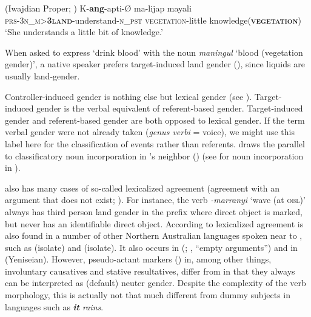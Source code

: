 \documentclass[output=collectionpaper]{langsci/langscibook}
\begin{document}
\ea\label{ex:WDG:73}
 (Iwajdian Proper; \citealt[972]{Singer2012})
\gll K-\textbf{ang}-apti-Ø	ma-lijap	mayali\\
\textsc{prs-3n\_m>\textbf{3land}}-understand-\textsc{n\_pst}	\textsc{vegetation}-little	knowledge(\textbf{\textsc{vegetation}})\\
\glt `She understands a little bit of knowledge.'\\
\z

When asked to express `drink blood' with the noun \textit{maningul} `blood (vegetation gender)', a native speaker prefers target-induced land gender (\citealt[970]{Singer2012}), since liquids are usually land-gender.

Controller-induced gender is nothing else but lexical gender (see ). Target-induced gender is the verbal equivalent of referent-based gender. Target-induced gender and referent-based gender are both opposed to lexical gender. If the term verbal gender were not already taken (\textit{genus verbi} = voice), we might use this label here for the classification of events rather than referents. \cite[978]{Singer2012} draws the parallel to classificatory noun incorporation in 's neighbor  () (see  for noun incorporation in ).

 also has many cases of so-called lexicalized agreement (agreement with an argument that does not exist; \citealt{Singer2011}). For instance, the verb \mbox{\textit{-marranyi}} `wave (at \textsc{obl})' always has third person land gender in the prefix where direct object is marked, but never has an identifiable direct object. According to \citet[640]{Singer2011} lexicalized agreement is also found in a number of other Northern Australian languages spoken near to , such as  (isolate) and  (isolate). It also occurs in  (; \citealt[84]{Frantz1995}, ``empty arguments'') and in  (Yeniseian). However,  pseudo-actant markers (\citealt[79]{Vajda2003}) in, among other things, involuntary causatives and stative resultatives, differ from  in that they always can be interpreted as (default) neuter gender. Despite the complexity of the  verb morphology, this is actually not that much different from dummy subjects in  languages such as  \textit{\textbf{it} rains}.
\end{document}
